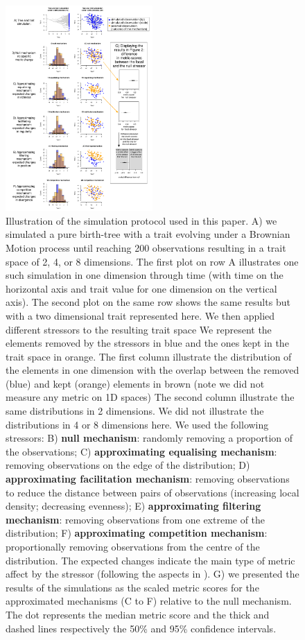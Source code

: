 \documentclass[12pt,letterpaper]{article}
\begin{document}
\begin{figure}[!htbp]
\centering
   \includegraphics[width=0.5\textwidth]{Figures/simulation_protocol_explained.pdf}
\caption{\scriptsize{Illustration of the simulation protocol used in this paper.
A) we simulated a pure birth-tree with a trait evolving under a Brownian Motion process until reaching 200 observations resulting in a trait space of 2, 4, or 8 dimensions.
The first plot on row A illustrates one such simulation in one dimension through time (with time on the horizontal axis and trait value for one dimension on the vertical axis).
The second plot on the same row shows the same results but with a two dimensional trait represented here.
We then applied different stressors to the resulting trait space
We represent the elements removed by the stressors in blue and the ones kept in the trait space in orange.
The first column illustrate the distribution of the elements in one dimension with the overlap between the removed (blue) and kept (orange) elements in brown (note we did not measure any metric on 1D spaces)
The second column illustrate the same distributions in 2 dimensions.
We did not illustrate the distributions in 4 or 8 dimensions here.
We used the following stressors:
B) \textbf{null mechanism}: randomly removing a proportion of the observations;
C) \textbf{approximating equalising mechanism}: removing observations on the edge of the distribution;
D) \textbf{approximating facilitation mechanism}: removing observations to reduce the distance between pairs of observations (increasing local density; decreasing evenness);
E) \textbf{approximating filtering mechanism}: removing observations from one extreme of the distribution;
F) \textbf{approximating competition mechanism}: proportionally removing observations from the centre of the distribution.
The expected changes indicate the main type of metric affect by the stressor (following the aspects in \citealt{mammola2021concepts}).
G) we presented the results of the simulations as the scaled metric scores for the approximated mechanisms (C to F) relative to the null mechanism. The dot represents the median metric score and the thick and dashed lines respectively the 50\% and 95\% confidence intervals.}}
\label{Fig:simulations}
\end{figure}
\bigskip
\end{document}
